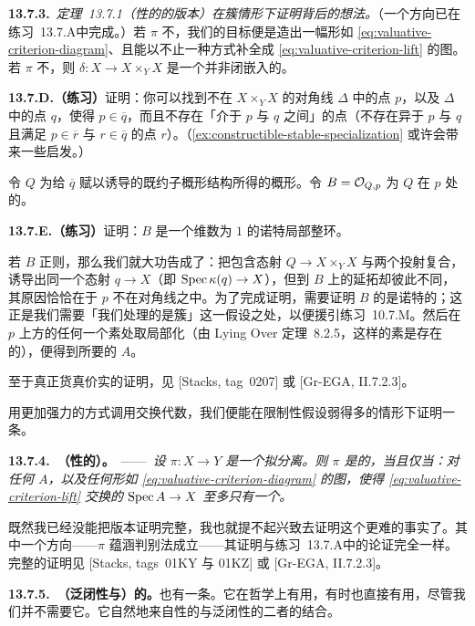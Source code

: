 \textbf{13.7.3.}\ \emph{定理~13.7.1（\trSeparated{}性的\trValuativeCriteria{}的\trDVR{}版本）在簇情形下证明背后的想法。}\quad （一个方向已在\mbox{练习~13.7.A}中完成。）若 $\pi$ 不\trSeparated，我们的目标便是造出一幅形如 \eqref{eq:valuative-criterion-diagram}、且能以不止一种方式补全成 \eqref{eq:valuative-criterion-lift} 的图。若 $\pi$ 不\trSeparated，则 $\delta\colon X\to X\times_Y X$ 是一个并非闭嵌入的\trLocallyClosedEmbedding。

\textbf{13.7.D.（练习）}\quad 证明：你可以找到不在 $X\times_Y X$ 的对角线 $\Delta$ 中的点 $p$，以及 $\Delta$ 中的点 $q$，使得 $p\in\overline{q}$，而且不存在「介于 $p$ 与 $q$ 之间」的点（不存在异于 $p$ 与 $q$ 且满足 $p\in\overline{r}$ 与 $r\in\overline{q}$ 的点 $r$）。（\cref{ex:constructible-stable-specialization} 或许会带来一些启发。）

令 $Q$ 为给 $\overline{q}$ 赋以诱导的既约子概形结构所得的概形。令 $B=\mathcal{O}_{Q,p}$ 为 $Q$ 在 $p$ 处的\trLocalRing。

\textbf{13.7.E.（练习）}\quad 证明：$B$ 是一个维数为 $1$ 的诺特局部整环。

若 $B$ 正则，那么我们就大功告成了：把包含态射 $Q\to X\times_Y X$ 与两个投射复合，诱导出同一个态射 $q\to X$（即 $\operatorname{Spec}\kappa(q)\to X$），但到 $B$ 上的延拓却彼此不同，其原因恰恰在于 $p$ 不在对角线之中。为了完成证明，需要证明 $B$ 的\trNormalization{}是诺特的；这正是我们需要「我们处理的是簇」这一假设之处，以便援引\mbox{练习~10.7.M}。然后在 $p$ 上方的任何一个素处取局部化（由 Lying Over 定理~8.2.5，这样的素是存在的），便得到所要的\trDVR{} $A$。

至于真正货真价实的证明，见 [Stacks, tag~0207] 或 [Gr-EGA, II.7.2.3]。

用更加强力的方式调用交换代数，我们便能在限制性假设弱得多的情形下证明一条\trValuativeCriteria。

\textbf{13.7.4.\ \trhTheorem{}（\trSeparated{}性的\trValuativeCriteria）。}\ ——\ \emph{设 $\pi\colon X\to Y$ 是一个拟分离\trMorphism。则 $\pi$ 是\trSeparated{}的，当且仅当：对任何\trValuationRing{} $A$，以及任何形如 \eqref{eq:valuative-criterion-diagram} 的图，使得 \eqref{eq:valuative-criterion-lift} 交换的\trMorphism{} $\operatorname{Spec} A\to X$ 至多只有一个。}

既然我已经没能把\trDVR{}版本证明完整，我也就提不起兴致去证明这个更难的事实了。其中一个方向——$\pi$ \trSeparated{}蕴涵判别法成立——其证明与\mbox{练习~13.7.A}中的论证完全一样。完整的证明见 [Stacks, tags~01KY 与 01KZ] 或 [Gr-EGA, II.7.2.3]。

\textbf{13.7.5.\ （泛闭性与）\trProperness{}的\trValuativeCriteria。}\quad \trProperness{}也有一条\trValuativeCriteria。它在哲学上有用，有时也直接有用，尽管我们并不需要它。它自然地来自\trSeparated{}性的\trValuativeCriteria{}与泛闭性的\trValuativeCriteria{}二者的结合。

